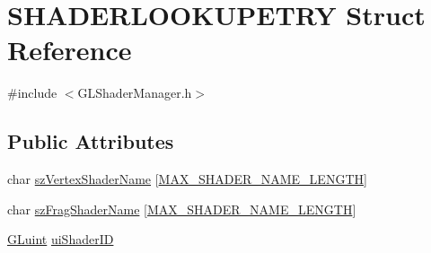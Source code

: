 \hypertarget{struct_s_h_a_d_e_r_l_o_o_k_u_p_e_t_r_y}{\section{S\-H\-A\-D\-E\-R\-L\-O\-O\-K\-U\-P\-E\-T\-R\-Y Struct Reference}
\label{struct_s_h_a_d_e_r_l_o_o_k_u_p_e_t_r_y}
}


{\ttfamily \#include $<$G\-L\-Shader\-Manager.\-h$>$}

\subsection*{Public Attributes}
\begin{DoxyCompactItemize}
\item 
char \hyperlink{struct_s_h_a_d_e_r_l_o_o_k_u_p_e_t_r_y_a1ff17144cc05720a188f54680a911d3d}{sz\-Vertex\-Shader\-Name} \mbox{[}\hyperlink{_g_l_shader_manager_8h_a5d16fbc66ce40c857fd0508e45dd4fc3}{M\-A\-X\-\_\-\-S\-H\-A\-D\-E\-R\-\_\-\-N\-A\-M\-E\-\_\-\-L\-E\-N\-G\-T\-H}\mbox{]}
\item 
char \hyperlink{struct_s_h_a_d_e_r_l_o_o_k_u_p_e_t_r_y_ac425eb553fc6bbab29dceb31b23c8384}{sz\-Frag\-Shader\-Name} \mbox{[}\hyperlink{_g_l_shader_manager_8h_a5d16fbc66ce40c857fd0508e45dd4fc3}{M\-A\-X\-\_\-\-S\-H\-A\-D\-E\-R\-\_\-\-N\-A\-M\-E\-\_\-\-L\-E\-N\-G\-T\-H}\mbox{]}
\item 
\hyperlink{_g_l_e_w_2glew_8h_a68c4714e43d8e827d80759f9cb864f3c}{G\-Luint} \hyperlink{struct_s_h_a_d_e_r_l_o_o_k_u_p_e_t_r_y_ab90ce8a60640adad877b5fda3839bdce}{ui\-Shader\-I\-D}
\end{DoxyCompactItemize}


